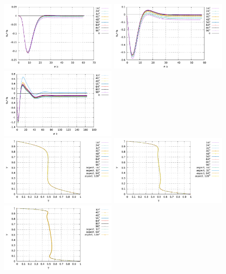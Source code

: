 \begin{center}
\includegraphics[width=5.7cm]{python_codes/fieldstone_110/results_EBA/q_Ra1e4.pdf}
\includegraphics[width=5.7cm]{python_codes/fieldstone_110/results_EBA/q_Ra1e5.pdf}
\includegraphics[width=5.7cm]{python_codes/fieldstone_110/results_EBA/q_Ra1e6.pdf}\\
\includegraphics[width=5.7cm]{python_codes/fieldstone_110/results_EBA/T_profile_Ra1e4.pdf}
\includegraphics[width=5.7cm]{python_codes/fieldstone_110/results_EBA/T_profile_Ra1e5.pdf}
\includegraphics[width=5.7cm]{python_codes/fieldstone_110/results_EBA/T_profile_Ra1e6.pdf}\\

\end{center}
